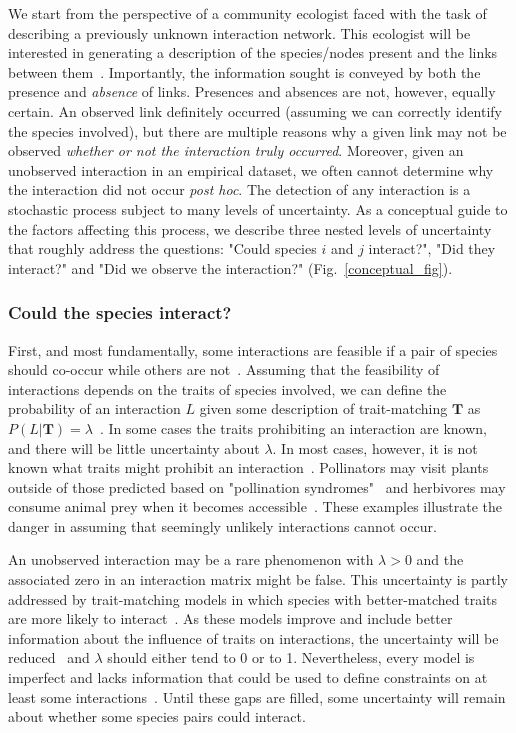 \documentclass[12pt]{article}
\begin{document}
\begin{spacing}{2.0}
      We start from the perspective of a community ecologist faced with the task of describing a previously unknown interaction network. This ecologist will be interested in generating a description of the species/nodes present and the links between them~\citep{Roslin2016}.  Importantly, the information sought is conveyed by both the presence and \emph{absence} of links. Presences and absences are not, however, equally certain. An observed link definitely occurred (assuming we can correctly identify the species involved), but there are multiple reasons why a given link may not be observed \emph{whether or not the interaction truly occurred}. Moreover, given an unobserved interaction in an empirical dataset, we often cannot determine why the interaction did not occur \emph{post hoc}. The detection of any interaction is a stochastic process subject to many levels of uncertainty. As a conceptual guide to the factors affecting this process, we describe three nested levels of uncertainty that roughly address the questions: "Could species $i$ and $j$ interact?", "Did they interact?" and "Did we observe the interaction?" (Fig.~\ref{conceptual_fig}). 


        \subsubsection*{Could the species interact?} 

          First, and most fundamentally, some interactions are feasible if a pair of species should co-occur while others are not~\citep{Poisot2015}. Assuming that the feasibility of interactions depends on the traits of species involved, we can define the probability of an interaction $L$ given some description of trait-matching $\mathbf{T}$ as $P(L|\mathbf{T}) = \lambda$~\citep{Bartomeus2013,Gravel2013,Weinstein2017}. 
          In some cases the traits prohibiting an interaction are known, and there will be little uncertainty about $\lambda$.
          In most cases, however, it is not known what traits might prohibit an interaction~\citep{Dormann2017}. Pollinators may visit plants outside of those predicted based on "pollination syndromes"~\citep{Weinstein2017a} and herbivores may consume animal prey when it becomes accessible~\citep{Furness1988,Pietz2000}. These examples illustrate the danger in assuming that seemingly unlikely interactions cannot occur.


          An unobserved interaction may be a rare phenomenon with $\lambda>0$ and the associated zero in an interaction matrix might be false. This uncertainty is partly addressed by trait-matching models in which species with better-matched traits are more likely to interact~\citep{Bartomeus2016,Jordano2016,Weinstein2017}. As these models improve and include better information about the influence of traits on interactions, the uncertainty will be reduced~\citep{Jordano2016} and $\lambda$ should either tend to 0 or to 1. Nevertheless, every model is imperfect and lacks information that could be used to define constraints on at least some interactions~\citep{Dormann2017}. Until these gaps are filled, some uncertainty will remain about whether some species pairs could interact.



\end{spacing}
\end{document}
